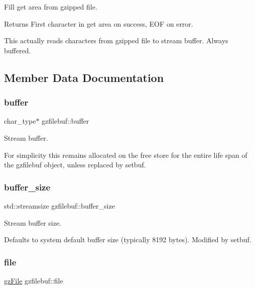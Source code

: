 Fill get area from gzipped file. 

\begin{DoxyReturn}{Returns}
First character in get area on success, E\+OF on error.
\end{DoxyReturn}
This actually reads characters from gzipped file to stream buffer. Always buffered. 

\subsection{Member Data Documentation}
\mbox{\label{classgzfilebuf_a9d74c28ba4a43d0033663d53e0a3e653}} 
\subsubsection{\texorpdfstring{buffer}{buffer}}
{\footnotesize\ttfamily char\+\_\+type$\ast$ gzfilebuf\+::buffer\hspace{0.3cm}{\ttfamily [private]}}



Stream buffer. 

For simplicity this remains allocated on the free store for the entire life span of the gzfilebuf object, unless replaced by setbuf. \mbox{\label{classgzfilebuf_a0b51afb243ec8460452ec3648f2796b8}} 
\subsubsection{\texorpdfstring{buffer\+\_\+size}{buffer\_size}}
{\footnotesize\ttfamily std\+::streamsize gzfilebuf\+::buffer\+\_\+size\hspace{0.3cm}{\ttfamily [private]}}



Stream buffer size. 

Defaults to system default buffer size (typically 8192 bytes). Modified by setbuf. \mbox{\label{classgzfilebuf_a202fd7bb0fda1bbe05fec2397255cbe6}} 
\subsubsection{\texorpdfstring{file}{file}}
{\footnotesize\ttfamily \mbox{\hyperlink{zlib_8h_a8e80bd9e2c359bc5bdabb2e97b4e62bf}{gz\+File}} gzfilebuf\+::file\hspace{0.3cm}{\ttfamily [private]}}


